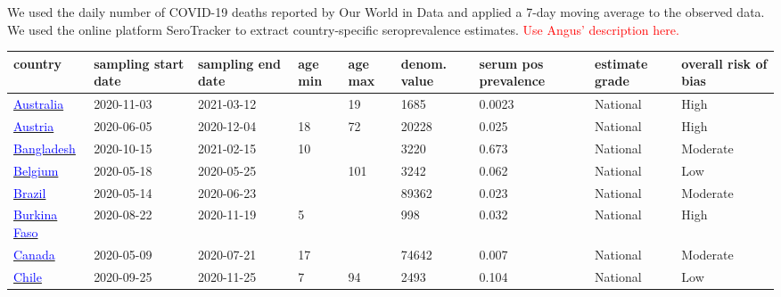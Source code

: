 We used the daily number of COVID-19 deaths reported by Our World in Data and applied a 7-day moving average to the observed data. 
We used the online platform SeroTracker to extract country-specific seroprevalence estimates.
\textcolor{red}{Use Angus' description here.}


\begin{table}[ht]  
    \footnotesize
    \begin{center}
        \begin{tabular}{p{2cm} | p{1.6cm} | p{1.6cm} | p{0.8cm} | p{0.8cm} | p{1cm} | p{1.3cm} | p{1.2cm} | p{1.2cm}}
           \hline            
           
           \textbf{country} & \textbf{sampling start date} & \textbf{sampling end date} & \textbf{age min} & \textbf{age max} & \textbf{denom. value} & \textbf{serum pos prevalence} & \textbf{estimate grade} & \textbf{overall risk of bias} \\ 
           \hline 
           \href{https://dx.doi.org/10.5694/mja2.51542}{\textcolor{blue}{Australia}} & 2020-11-03 & 2021-03-12 &  & 19 & 1685 & 0.0023 & National & High \\ 
           \hline 
           \href{https://dx.doi.org/10.1007/s15010-021-01639-0}{\textcolor{blue}{Austria}} & 2020-06-05 & 2020-12-04 & 18 & 72 & 20228 & 0.025 & National & High \\ 
           \hline 
           \href{https://dx.doi.org/10.1371/journal.pone.0268093}{\textcolor{blue}{Bangladesh}} & 2020-10-15 & 2021-02-15 & 10 &  & 3220 & 0.673 & National & Moderate \\ 
           \hline 
           \href{https://dx.doi.org/10.2807/1560-7917.ES.2022.27.9.2100419}{\textcolor{blue}{Belgium}} & 2020-05-18 & 2020-05-25 &  & 101 & 3242 & 0.062 & National & Low \\ 
           \hline 
           \href{https://www.ncbi.nlm.nih.gov/pmc/articles/PMC8225319/}{\textcolor{blue}{Brazil}} & 2020-05-14 & 2020-06-23 &  &  & 89362 & 0.023 & National & Moderate \\ 
           \hline 
           \href{https://dx.doi.org/10.3389/fpubh.2022.1048404}{\textcolor{blue}{Burkina Faso}} & 2020-08-22 & 2020-11-19 & 5 &  & 998 & 0.032 & National & High \\ 
           \hline 
           \href{http://dx.doi.org/10.1111/trf.16296}{\textcolor{blue}{Canada}} & 2020-05-09 & 2020-07-21 & 17 &  & 74642 & 0.007 & National & Moderate \\ 
           \hline 
           \href{https://dx.doi.org/10.1186/s12879-022-07045-7}{\textcolor{blue}{Chile}} & 2020-09-25 & 2020-11-25 & 7 & 94 & 2493 & 0.104 & National & Low \\ 

\end{tabular}
\end{center}
\end{table}
